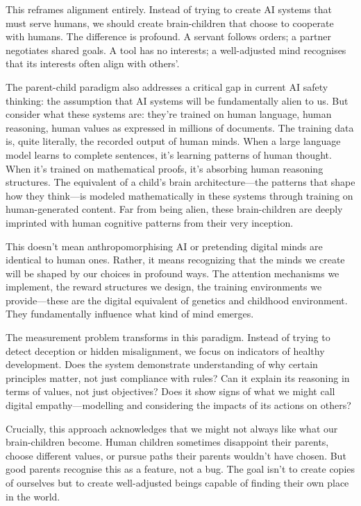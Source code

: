 \documentclass[acmsmall,screen]{acmart}
\begin{document}
This reframes alignment entirely.
Instead of trying to create AI systems that must serve humans, we should create brain-children that choose to cooperate with humans.
The difference is profound.
A servant follows orders; a partner negotiates shared goals.
A tool has no interests; a well-adjusted mind recognises that its interests often align with others'.

The parent-child paradigm also addresses a critical gap in current AI safety thinking: the assumption that AI systems will be fundamentally alien to us.
But consider what these systems are: they're trained on human language, human reasoning, human values as expressed in millions of documents.
The training data is, quite literally, the recorded output of human minds.
When a large language model learns to complete sentences, it's learning patterns of human thought.
When it's trained on mathematical proofs, it's absorbing human reasoning structures.
The equivalent of a child's brain architecture---the patterns that shape how they think---is modeled mathematically in these systems through training on human-generated content.
Far from being alien, these brain-children are deeply imprinted with human cognitive patterns from their very inception.

This doesn't mean anthropomorphising AI or pretending digital minds are identical to human ones.
Rather, it means recognizing that the minds we create will be shaped by our choices in profound ways.
The attention mechanisms we implement, the reward structures we design, the training environments we provide---these are the digital equivalent of genetics and childhood environment.
They fundamentally influence what kind of mind emerges.

The measurement problem transforms in this paradigm.
Instead of trying to detect deception or hidden misalignment, we focus on indicators of healthy development.
Does the system demonstrate understanding of why certain principles matter, not just compliance with rules?
Can it explain its reasoning in terms of values, not just objectives?
Does it show signs of what we might call digital empathy---modelling and considering the impacts of its actions on others?

Crucially, this approach acknowledges that we might not always like what our brain-children become.
Human children sometimes disappoint their parents, choose different values, or pursue paths their parents wouldn't have chosen.
But good parents recognise this as a feature, not a bug.
The goal isn't to create copies of ourselves but to create well-adjusted beings capable of finding their own place in the world.
\end{document}
